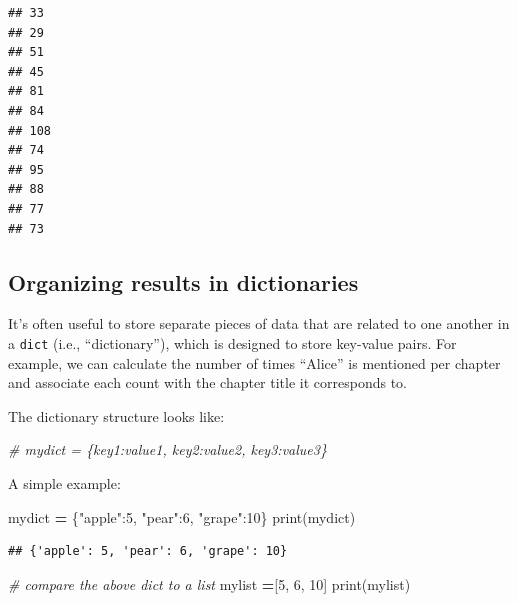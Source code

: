 \documentclass[]{book}
\newenvironment{Shaded}{\begin{snugshade}}{\end{snugshade}}
\newcommand{\BuiltInTok}[1]{#1}
\newcommand{\CommentTok}[1]{\textcolor[rgb]{0.56,0.35,0.01}{\textit{#1}}}
\newcommand{\DecValTok}[1]{\textcolor[rgb]{0.00,0.00,0.81}{#1}}
\newcommand{\NormalTok}[1]{#1}
\newcommand{\OperatorTok}[1]{\textcolor[rgb]{0.81,0.36,0.00}{\textbf{#1}}}
\newcommand{\StringTok}[1]{\textcolor[rgb]{0.31,0.60,0.02}{#1}}
\begin{document}
\begin{verbatim}
## 33
## 29
## 51
## 45
## 81
## 84
## 108
## 74
## 95
## 88
## 77
## 73
\end{verbatim}

\hypertarget{organizing-results-in-dictionaries}{%
\subsection{Organizing results in dictionaries}\label{organizing-results-in-dictionaries}}

It's often useful to store separate pieces of data that are related to one another in a \texttt{dict} (i.e., ``dictionary''), which is designed to store key-value pairs. For example, we can calculate the number of times ``Alice'' is mentioned per chapter and associate each count with the chapter title it corresponds to.

The dictionary structure looks like:

\begin{Shaded}
\begin{Highlighting}[]
\CommentTok{# mydict = \{key1:value1, key2:value2, key3:value3\}}
\end{Highlighting}
\end{Shaded}

A simple example:

\begin{Shaded}
\begin{Highlighting}[]
\NormalTok{mydict }\OperatorTok{=}\NormalTok{ \{}\StringTok{"apple"}\NormalTok{:}\DecValTok{5}\NormalTok{, }\StringTok{"pear"}\NormalTok{:}\DecValTok{6}\NormalTok{, }\StringTok{"grape"}\NormalTok{:}\DecValTok{10}\NormalTok{\}}
\BuiltInTok{print}\NormalTok{(mydict)}
\end{Highlighting}
\end{Shaded}

\begin{verbatim}
## {'apple': 5, 'pear': 6, 'grape': 10}
\end{verbatim}

\begin{Shaded}
\begin{Highlighting}[]
\CommentTok{# compare the above dict to a list}
\NormalTok{mylist }\OperatorTok{=}\NormalTok{[}\DecValTok{5}\NormalTok{, }\DecValTok{6}\NormalTok{, }\DecValTok{10}\NormalTok{]}
\BuiltInTok{print}\NormalTok{(mylist)}
\end{Highlighting}
\end{Shaded}
\end{document}

